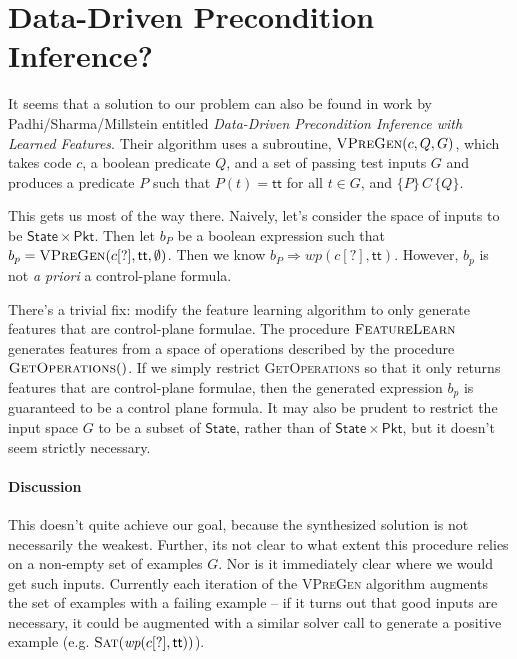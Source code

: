 \documentclass{article}
\newcommand{\TRUE}{\mathsf{tt}}
\newcommand{\Pkt}{\mathsf{Pkt}}
\newcommand{\State}{\mathsf{State}}
\newcommand{\WP}{\textit{wp}}
\newcommand{\instr}{[?]}
\begin{document}
\clearpage
\section{Data-Driven Precondition Inference?}


It seems that a solution to our problem can also be found in work by
Padhi/Sharma/Millstein entitled \textit{Data-Driven Precondition Inference with
  Learned Features}. Their algorithm uses a subroutine,
$\textsc{VPreGen}(c,Q,G)$, which takes code $c$, a boolean predicate $Q$,
and a set of passing test inputs $G$ and produces a predicate $P$ such that
$P(t) = \TRUE$ for all $t \in G$, and $\{P\}\,C\,\{Q\}$.

This gets us most of the way there. Naively, let's consider the space of inputs
to be $\State \times \Pkt$. Then let $b_P$ be a boolean expression such that
$b_p = \textsc{VPreGen}(c\instr,\TRUE,\emptyset)$. Then we know $b_P \Rightarrow
\WP(c\instr,\TRUE)$. However, $b_p$ is not \emph{a priori} a control-plane
formula.

There's a trivial fix: modify the feature learning algorithm to only generate
features that are control-plane formulae. The procedure $\textsc{FeatureLearn}$
generates features from a space of operations described by the procedure
$\textsc{GetOperations}()$. If we simply restrict \textsc{GetOperations} so that
it only returns features that are control-plane formulae, then the generated
expression $b_p$ is guaranteed to be a control plane formula. It may also be
prudent to restrict the input space $G$ to be a subset of $\State$, rather than
of $\State \times \Pkt$, but it doesn't seem strictly necessary.


\paragraph{Discussion} This doesn't quite achieve our goal, because the
synthesized solution is not necessarily the weakest. Further, its not clear to
what extent this procedure relies on a non-empty set of examples $G$. Nor is it
immediately clear where we would get such inputs. Currently each iteration of
the \textsc{VPreGen} algorithm augments the set of examples with a failing
example -- if it turns out that good inputs are necessary, it could be augmented
with a similar solver call to generate a positive example (e.g.
$\textsc{Sat}(\WP(c\instr,\TRUE))$).
\end{document}
